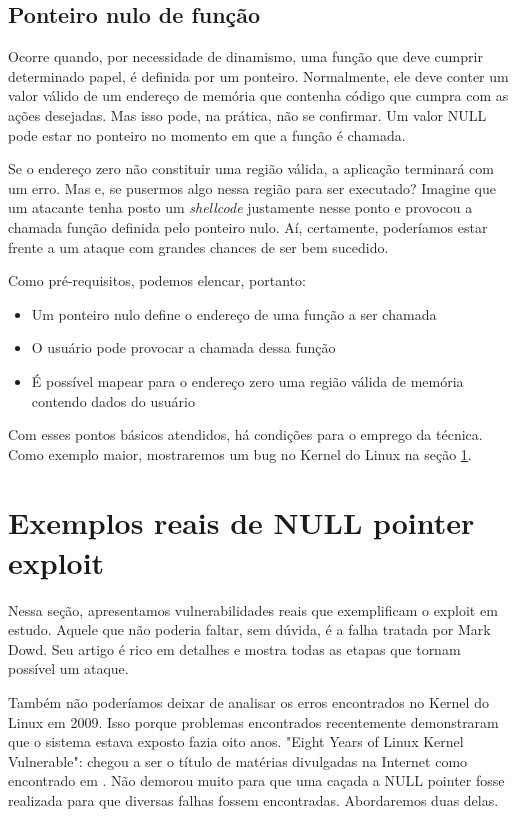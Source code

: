 			
		\subsection{Ponteiro nulo de função}
			Ocorre quando, por necessidade de dinamismo, uma função que deve cumprir determinado
			papel, é definida por um ponteiro. Normalmente, ele deve conter um valor válido
			de um endereço de memória que contenha código que cumpra com as ações desejadas.
			Mas isso pode, na prática, não se confirmar. Um valor NULL pode estar no ponteiro
			no momento em que a função é chamada.

			
			Se o endereço zero não constituir uma região válida, a aplicação terminará com um erro.
			Mas e, se pusermos algo nessa região para ser executado? Imagine que um atacante tenha
			posto um \textsl{shellcode} justamente nesse ponto e provocou a chamada função definida pelo
			ponteiro nulo. Aí, certamente, poderíamos estar frente a um ataque com grandes chances de
			ser bem sucedido.
			

			Como pré-requisitos, podemos elencar, portanto:
			\begin{itemize}
				\item{Um ponteiro nulo define o endereço de uma função a ser chamada}
				\item{O usuário pode provocar a chamada dessa função}
				\item{É possível mapear para o endereço zero uma região válida de memória contendo dados do usuário}
			\end{itemize}
			Com esses pontos básicos atendidos, há condições para o emprego da técnica.
			Como exemplo maior, mostraremos um bug no Kernel do Linux na seção \ref{sec:exemplos_null_pointer}. 


	\section{Exemplos reais de NULL pointer exploit}
	\label{sec:exemplos_null_pointer}

		Nessa seção, apresentamos vulnerabilidades reais que exemplificam o exploit em estudo.
		Aquele que não poderia faltar, sem dúvida, é a falha tratada por Mark Dowd.
		Seu artigo é rico em detalhes e mostra todas as etapas que tornam possível
		um ataque.


		Também não poderíamos deixar de analisar os erros encontrados no Kernel do Linux em 2009.
		Isso porque problemas encontrados recentemente demonstraram que o sistema estava exposto
		fazia oito anos. "Eight Years of Linux Kernel Vulnerable": chegou a ser o título de matérias
		divulgadas na Internet como encontrado em \cite{Cunningham2009}.
		Não demorou muito para que uma caçada a NULL pointer fosse realizada para que diversas falhas
		fossem encontradas. Abordaremos duas delas.
			

